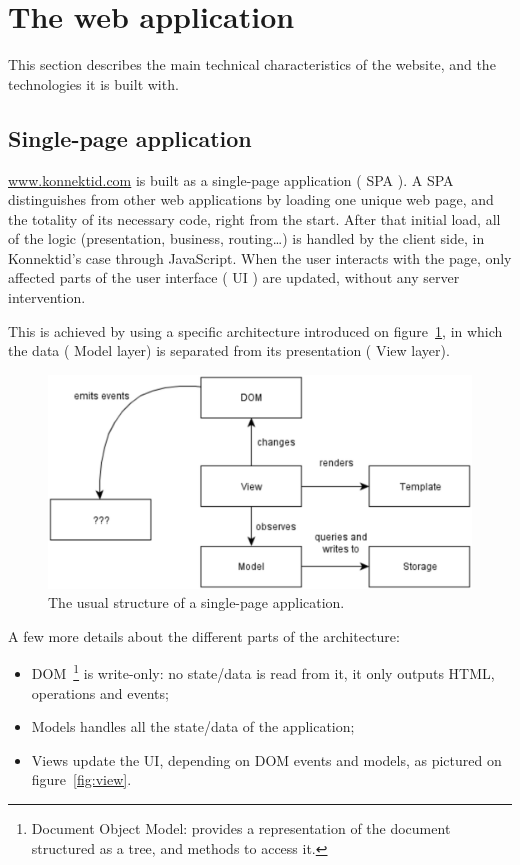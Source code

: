 \section{The web application}
\label{sec:website}

This section describes the main technical characteristics of the website, and the technologies it is built with.

\subsection{Single-page application}
\label{ssec:spa}

\url{www.konnektid.com} is built as a single-page application (\guillemotleft{} SPA \guillemotright{}).
A SPA distinguishes from other web applications by loading one unique web page, and the totality of its necessary code, right from the start.
After that initial load, all of the logic (presentation, business, routing\ldots) is handled by the client side, in Konnektid's case through JavaScript.
When the user interacts with the page, only affected parts of the user interface (\guillemotleft{} UI \guillemotright{}) are updated, without any server intervention.

This is achieved by using a specific architecture introduced on {\sc figure}~\ref{fig:spaArchi}, in which the data (\guillemotleft{} Model
\guillemotright{} layer) is separated from its presentation (\guillemotleft{} View \guillemotright{} layer)\cite{spa}.

\begin{figure}[H]
    \centering
    \includegraphics[scale=0.6]{figure/spaArchi.png}
    \caption{The usual structure of a single-page application.}
    \label{fig:spaArchi}
\end{figure}

A few more details about the different parts of the architecture:
\begin{itemize}[noitemsep]
    \item DOM~\footnote{Document Object Model: provides a representation of the document structured as a tree, and methods to access it.} is write-only:
    no state/data is read from it, it only outputs HTML, operations and events;
    \item Models handles all the state/data of the application;
    \item Views update the UI, depending on DOM events and models, as pictured on {\sc figure}~\ref{fig:view}.
\end{itemize}

